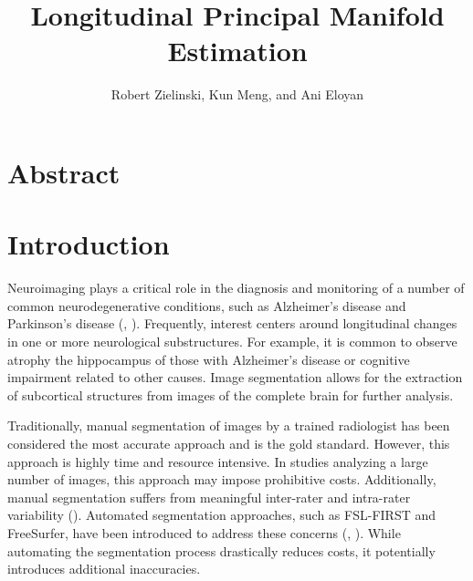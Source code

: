 \documentclass[11pt,reqno]{article}
\theoremstyle{definition}
\begin{document}
\title{Longitudinal Principal Manifold Estimation}
\author[1]{Robert Zielinski, Kun Meng, and Ani Eloyan}


\maketitle

\doublespacing

\section*{Abstract}

\section{Introduction}

Neuroimaging plays a critical role in the diagnosis and monitoring of a number of common neurodegenerative conditions, such as Alzheimer's disease and Parkinson's disease (\cite{knopmanAlzheimerDisease2021}, \cite{poeweParkinsonDisease2017}). Frequently, interest centers around longitudinal changes in one or more neurological substructures. For example, it is common to observe atrophy the hippocampus of those with Alzheimer's disease or cognitive impairment related to other causes. Image segmentation allows for the extraction of subcortical structures from images of the complete brain for further analysis.

Traditionally, manual segmentation of images by a trained radiologist has been considered the most accurate approach and is the gold standard. However, this approach is highly time and resource intensive. In studies analyzing a large number of images, this approach may impose prohibitive costs. Additionally, manual segmentation suffers from meaningful inter-rater and intra-rater variability (\cite{boccardiSurveyProtocolsManual2011}). Automated segmentation approaches, such as FSL-FIRST and FreeSurfer, have been introduced to address these concerns (\cite{patenaudeBayesianModelShape2011}, \cite{reuterWithinsubjectTemplateEstimation2012}). While automating the segmentation process drastically reduces costs, it potentially introduces additional inaccuracies.
\end{document}
